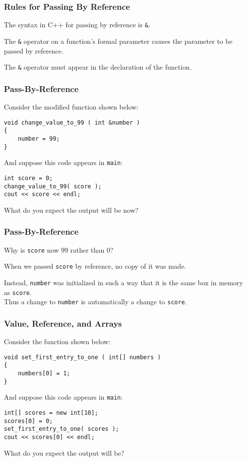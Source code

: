 \begin{frame}
\frametitle{Rules for Passing By Reference}

The syntax in C++ for passing by reference is \alert{\texttt{\&}}.

The \texttt{\&} operator on a function's formal parameter causes the parameter to be passed by reference.


The \texttt{\&} operator must appear in the declaration of the function.


\end{frame}

\begin{frame}[fragile]
\frametitle{Pass-By-Reference}
Consider the modified function shown below:

\begin{verbatim}
void change_value_to_99 ( int &number )
{
    number = 99;
}
\end{verbatim}

And suppose this code appears in \texttt{main}:
\begin{verbatim}
int score = 0;
change_value_to_99( score );
cout << score << endl;
\end{verbatim}

What do you expect the output will be now?

\end{frame}

\begin{frame}
\frametitle{Pass-By-Reference}

Why is \texttt{score} now 99 rather than 0?

When we passed \texttt{score} by reference, no copy of it was made. 

Instead, \texttt{number} was initialized in such a way that it is the same box in memory as \texttt{score}.\\
\quad Thus a change to \texttt{number} is automatically a change to \texttt{score}.

\end{frame}

\begin{frame}[fragile]
\frametitle{Value, Reference, and Arrays}

Consider the function shown below:

\begin{verbatim}
void set_first_entry_to_one ( int[] numbers )
{
    numbers[0] = 1;
}
\end{verbatim}

And suppose this code appears in \texttt{main}:
\begin{verbatim}
int[] scores = new int[10];
scores[0] = 0;
set_first_entry_to_one( scores );
cout << scores[0] << endl;
\end{verbatim}

What do you expect the output will be?

\end{frame}

